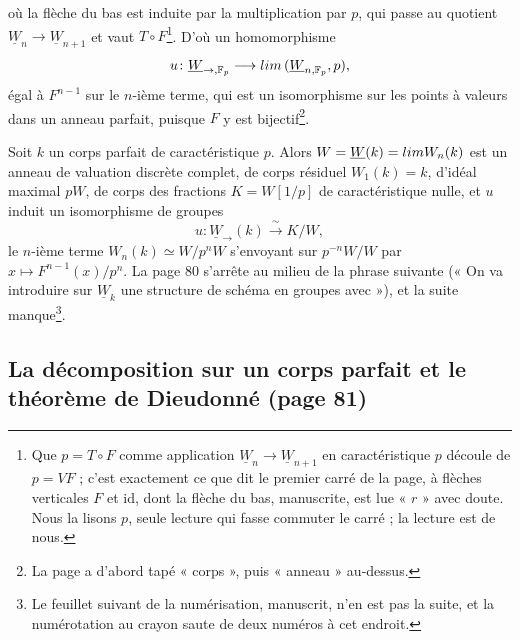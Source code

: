 \documentclass[11pt,a4paper]{article}
\begin{document}

où la flèche du bas est induite par la multiplication par $p$, qui
passe au quotient $\underline{W}_n \to \underline{W}_{n+1}$ et vaut
$T \circ F$\footnote{Que $p = T \circ F$ comme application
$\underline{W}_n \to \underline{W}_{n+1}$ en caractéristique $p$ découle
de $p = VF$ ; c'est exactement ce que dit le premier carré de la page, à
flèches verticales $F$ et $\mathrm{id}$, dont la flèche du bas, manuscrite,
est lue « $r$ » avec doute. Nous la lisons $p$, seule lecture qui fasse
commuter le carré ; la lecture est de nous.}. D'où un homomorphisme
\[
u \colon \underline{W}_{\to,\mathbb{F}_p} \longrightarrow
\varinjlim\, (\underline{W}_{n,\mathbb{F}_p}, p),
\]
égal à $F^{n-1}$ sur le $n$-ième terme, qui est un isomorphisme sur les
points à valeurs dans un anneau parfait, puisque $F$ y est
bijectif\footnote{La page a d'abord tapé « corps », puis « anneau »
au-dessus.}.

Soit $k$ un corps parfait de caractéristique $p$. Alors
$W = \underline{W}(k) = \varprojlim W_n(k)$ est un anneau de valuation
discrète complet, de corps résiduel $W_1(k) = k$, d'idéal maximal $pW$, de
corps des fractions $K = W[1/p]$ de caractéristique nulle, et $u$ induit
un isomorphisme de groupes
\[
u \colon \underline{W}_{\to}(k) \xrightarrow{\ \sim\ } K/W ,
\]
le $n$-ième terme $W_n(k) \simeq W/p^{n}W$ s'envoyant sur $p^{-n}W/W$ par
$x \mapsto F^{n-1}(x)/p^{n}$. La page 80 s'arrête au milieu de la phrase
suivante (« On va introduire sur $\underline{W}_k$ une structure de schéma
en groupes avec »), et la suite manque\footnote{Le feuillet suivant de la
numérisation, manuscrit, n'en est pas la suite, et la numérotation au
crayon saute de deux numéros à cet endroit.}.

\subsection*{La décomposition sur un corps parfait et le théorème de Dieudonné (page 81)}
\end{document}
